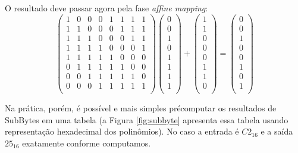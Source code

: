 \begin{example}
O resultado deve passar agora pela fase {\em affine mapping}:
\begin{displaymath}
\left(\begin{array}{cccccccc}
1 & 0 & 0 & 0 & 1 & 1 & 1 & 1 \\
1 & 1 & 0 & 0 & 0 & 1 & 1 & 1 \\
1 & 1 & 1 & 0 & 0 & 0 & 1 & 1 \\
1 & 1 & 1 & 1 & 0 & 0 & 0 & 1 \\
1 & 1 & 1 & 1 & 1 & 0 & 0 & 0 \\
0 & 1 & 1 & 1 & 1 & 1 & 0 & 0 \\
0 & 0 & 1 & 1 & 1 & 1 & 1 & 0 \\
0 & 0 & 0 & 1 & 1 & 1 & 1 & 1 \\\end{array} \right) 
\left( \begin{array}{c}
0\\ 0\\ 1\\ 0\\ 1\\ 1\\ 1\\ 1\\\end{array} \right)
+
\left( \begin{array}{c}
1\\ 1\\ 0\\ 0\\ 0\\ 1\\ 1\\ 0\\\end{array} \right)
=
\left( \begin{array}{c}
0\\ 0\\ 1\\ 0\\ 0\\ 1\\ 0\\ 1\\\end{array} \right)
\end{displaymath}

Na prática, porém, é possível e mais simples précomputar os resultados de SubBytes em uma tabela (a Figura \ref{fig:subbyte} apresenta essa tabela usando representação hexadecimal dos polinômios).
No caso a entrada é $C2_{16}$ e a saída $25_{16}$ exatamente conforme computamos.
\end{example}


